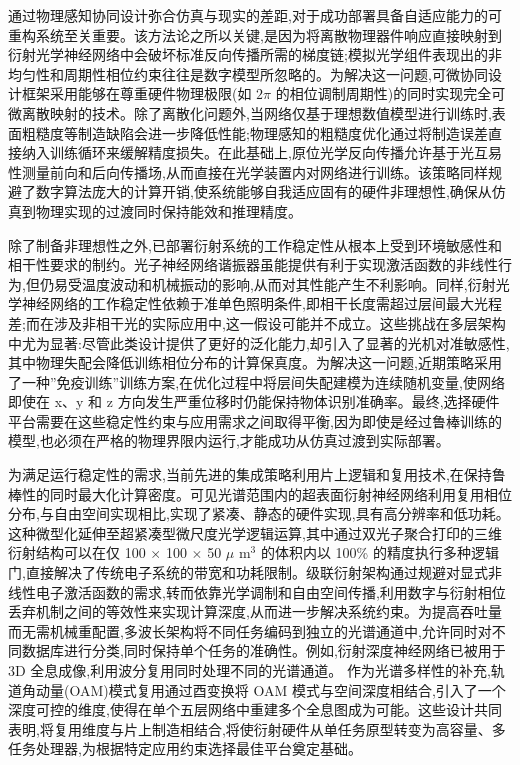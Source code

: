 通过物理感知协同设计弥合仿真与现实的差距,对于成功部署具备自适应能力的可重构系统至关重要。该方法论之所以关键,是因为将离散物理器件响应直接映射到衍射光学神经网络中会破坏标准反向传播所需的梯度链;模拟光学组件表现出的非均匀性和周期性相位约束往往是数字模型所忽略的。为解决这一问题,可微协同设计框架采用能够在尊重硬件物理极限(如 \(2\pi\) 的相位调制周期性)的同时实现完全可微离散映射的技术。除了离散化问题外,当网络仅基于理想数值模型进行训练时,表面粗糙度等制造缺陷会进一步降低性能;物理感知的粗糙度优化通过将制造误差直接纳入训练循环来缓解精度损失。在此基础上,原位光学反向传播允许基于光互易性测量前向和后向传播场,从而直接在光学装置内对网络进行训练。该策略同样规避了数字算法庞大的计算开销,使系统能够自我适应固有的硬件非理想性,确保从仿真到物理实现的过渡同时保持能效和推理精度。\citep{doi_10_1145_3508352_3549378_13c53996} \citep{doi_10_1109_dac56929_2023_10247715_f78d6713} \citep{doi_10_1364_prj_389553_d7a30418}

除了制备非理想性之外,已部署衍射系统的工作稳定性从根本上受到环境敏感性和相干性要求的制约。光子神经网络谐振器虽能提供有利于实现激活函数的非线性行为,但仍易受温度波动和机械振动的影响,从而对其性能产生不利影响。同样,衍射光学神经网络的工作稳定性依赖于准单色照明条件,即相干长度需超过层间最大光程差;而在涉及非相干光的实际应用中,这一假设可能并不成立。这些挑战在多层架构中尤为显著:尽管此类设计提供了更好的泛化能力,却引入了显著的光机对准敏感性,其中物理失配会降低训练相位分布的计算保真度。为解决这一问题,近期策略采用了一种''免疫训练''训练方案,在优化过程中将层间失配建模为连续随机变量,使网络即使在 x、y 和 z 方向发生严重位移时仍能保持物体识别准确率。最终,选择硬件平台需要在这些稳定性约束与应用需求之间取得平衡,因为即使是经过鲁棒训练的模型,也必须在严格的物理界限内运行,才能成功从仿真过渡到实际部署。\citep{doi_10_3390_nano14080697_c372a140} \citep{doi_10_1364_oe_523619_ddeb1b53} \citep{doi_10_1515_nanoph_2020_0291_c4a9f42d}

为满足运行稳定性的需求,当前先进的集成策略利用片上逻辑和复用技术,在保持鲁棒性的同时最大化计算密度。可见光谱范围内的超表面衍射神经网络利用复用相位分布,与自由空间实现相比,实现了紧凑、静态的硬件实现,具有高分辨率和低功耗。这种微型化延伸至超紧凑型微尺度光学逻辑运算,其中通过双光子聚合打印的三维衍射结构可以在仅 100 \(\times\) 100 \(\times\) 50 \(\mu\) m\(^{3}\) 的体积内以 100\% 的精度执行多种逻辑门,直接解决了传统电子系统的带宽和功耗限制。级联衍射架构通过规避对显式非线性电子激活函数的需求,转而依靠光学调制和自由空间传播,利用数字与衍射相位丢弃机制之间的等效性来实现计算深度,从而进一步解决系统约束。为提高吞吐量而无需机械重配置,多波长架构将不同任务编码到独立的光谱通道中,允许同时对不同数据库进行分类,同时保持单个任务的准确性。例如,衍射深度神经网络已被用于 3D 全息成像,利用波分复用同时处理不同的光谱通道。\citep{doi_10_1109_acp_ipoc63121_2024_10809872_a7935774} 作为光谱多样性的补充,轨道角动量(OAM)模式复用通过酉变换将 OAM 模式与空间深度相结合,引入了一个深度可控的维度,使得在单个五层网络中重建多个全息图成为可能。这些设计共同表明,将复用维度与片上制造相结合,将使衍射硬件从单任务原型转变为高容量、多任务处理器,为根据特定应用约束选择最佳平台奠定基础。\citep{doi_10_3390_mi16010008_4be72643} \citep{doi_10_1021_acsphotonics_5c02472_283a8bea} \citep{doi_10_1515_nanoph_2022_0615_9a3be8d6} \citep{doi_10_1364_oe_447337_61ffab71} \citep{doi_10_1364_ol_428761_f1f67ac8}


